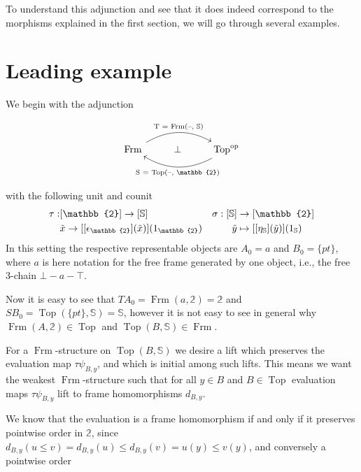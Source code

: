 \documentclass[12pt,a4paper]{article}
\DeclareMathOperator{\Hom}{Hom}
\DeclareMathOperator{\Set}{Set}
\DeclareMathOperator{\Frm}{Frm}
\DeclareMathOperator{\Top}{Top}
\DeclareMathOperator{\op}{op}
\def\HomA{\ensuremath\mathcal{A}}
\def\t{\ensuremath\tilde}
\begin{document}
To understand this adjunction and see that it does indeed correspond to the morphisms explained in the first section, we will go through several examples.


\section{Leading example}


We begin with the adjunction 

\[\begin{tikzcd}
	{\Frm} & \bot & {\Top^{\op}}
	\arrow["{\text{T = $\Frm$(--, $\mathbb{S}$)}}" , bend left, from=1-1, to=1-3]
	\arrow["{\text{S = $\Top$(--, $\mathbb{2}$)}}", bend left, from=1-3, to=1-1]
\end{tikzcd}\]

with the following unit and counit
\begin{align*}
	\tau:& [\mathbb{2}] \to [\mathbb{S}] & \sigma: [\mathbb{S}]&\to [\mathbb{2}]\\
	&\t x \to  [[\epsilon_{\mathbb{2}}](\t x)](1_{\mathbb{2}})&\t y &\mapsto [[\eta_{\mathbb{S}}](\t y)](1_{\mathbb{S}})
\end{align*}
In this setting  the respective representable objects are $A_0 = a$ and $B_0 = \{pt\}$, where $a$ is here  notation for the free frame generated by one object, i.e., the free 3-chain $\bot - a - \top$. 

Now it is easy to see that $TA_0 = \Frm(a, \mathbb{2}) = \mathbb{2}$ and $SB_0 = \Top(\{pt\}, \mathbb{S}) = \mathbb{S}$, however it is not easy to see in general why $\Frm(A, \mathbb{2}) \in \Top$ and $\Top(B, \mathbb{S}) \in \Frm$.

For a $\Frm$-structure on $\Top(B, \mathbb{S})$ we desire a lift which preserves the evaluation map $\tau\psi_{B,y}$, and which is initial among such lifts. This means we want the weakest $\Frm$-structure such that for all $y \in B$ and $B \in \Top$ evaluation maps $\tau \psi_{B,y}$ lift to frame homomorphisms $d_{B,y}$.

We know that the evaluation is a frame homomorphism if and only if it preserves pointwise order in $\mathbb{2}$, since   $d_{B,y}(u \leq v) = d_{B,y}(u) \leq d_{B,y}(v) = u(y) \leq v(y)$, and conversely a pointwise order 
\end{document}
